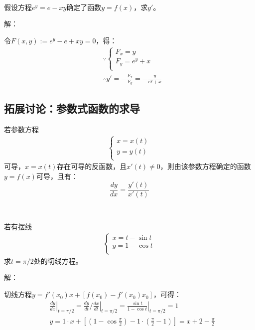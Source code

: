 ~

\begin{example}
假设方程$e^y=e-xy$确定了函数$y=f\left( x \right) $，求$y'$。
\end{example}

解：

令$F\left( x,y \right) :=e^y-e+xy=0$，得：
\begin{align*}
&\because \begin{cases}
	F_x=y\\
	F_y=e^y+x\\
\end{cases} \\
&\therefore y'=-\frac{F_x}{F_y}=-\frac{y}{e^y+x}
\end{align*}

\subsection{拓展讨论：参数式函数的求导}

\begin{theorem}[参数函数求导定理]
若参数方程
\begin{align*}
\begin{cases}
	x=x\left( t \right)\\
	y=y\left( t \right)\\
\end{cases}
\end{align*}
可导，$x=x\left( t \right) $存在可导的反函数，且$x'\left( t \right) \ne 0$，则由该参数方程确定的函数$y=f\left( x \right) $可导，且有：
\[
\frac{dy}{dx}=\frac{y'\left( t \right)}{x'\left( t \right)}
\]
\end{theorem}

~

\begin{example}
若有摆线
\begin{align*}
\begin{cases}
	x=t-\sin t\\
	y=1-\cos t\\
\end{cases}
\end{align*}
求$t=\pi /2$处的切线方程。
\end{example}

解：

切线方程$y=f'\left( x_0 \right) x+\left[ f\left( x_0 \right) -f'\left( x_0 \right) x_0 \right] $，可得：
\begin{align*}
&\left. \frac{dy}{dx} \right|_{t=\pi /2}=\left. \frac{dy}{dt}/\frac{dx}{dt} \right|_{t=\pi /2}=\left. \frac{\sin t}{1-\cos t} \right|_{t=\pi /2}=1 \\
&y=1\cdot x+\left[ \left( 1-\cos \frac{\pi}{2} \right) -1\cdot \left( \frac{\pi}{2}-1 \right) \right] =x+2-\frac{\pi}{2}
\end{align*}

